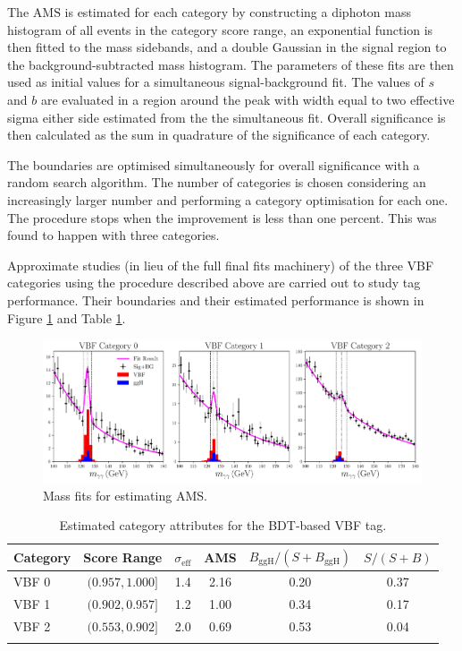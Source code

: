 The $\mathrm{AMS}$ is estimated for each category by constructing a diphoton mass histogram of all events in the category score range, an exponential function is then fitted to the mass sidebands, and a double Gaussian in the signal region to the background-subtracted mass histogram. The parameters of these fits are then used as initial values for a simultaneous signal-background fit. 
The values of $s$ and $b$ are evaluated in a region around the peak with width equal to two effective sigma either side estimated from the the simultaneous fit. Overall significance is then calculated as the sum in quadrature of the significance of each category. 

The boundaries are optimised simultaneously for overall significance with a random search algorithm. The number of categories is chosen considering an increasingly larger number and performing a category optimisation for each one. The procedure stops when the improvement is less than one percent. This was found to happen with three categories. 

Approximate studies (in lieu of the full final fits machinery) of the three VBF categories using the procedure described above are carried out to study tag performance. Their boundaries and their estimated performance is shown in Figure \ref{fig:event_categorisaton:bdt_mass_fits} and Table \ref{tab:event_selection:legacy_cats}.
\begin{figure}[h!]
    \centering
    \includegraphics[width=1.0\textwidth]{figures/event_selection/BDT_mass_fits.pdf}
    \caption{Mass fits for estimating AMS.}
    \label{fig:event_categorisaton:bdt_mass_fits}
\end{figure}
\begin{table}[h!]
    \centering
    \renewcommand{\arraystretch}{1.3}
    \begin{tabular}{ l | c c c c c }
        \thickhline
        Category & Score Range & $\sigma_{\mathrm{eff}}$ & AMS & $B_{\mathrm{ggH}}/(S+B_{\mathrm{ggH}})$ & $S/(S+B)$ \\
        \hline
        VBF 0 & $(0.957, 1.000]$ & 1.4 &  2.16 & 0.20 & 0.37 \\
        VBF 1 & $(0.902, 0.957]$ & 1.2 &  1.00 & 0.34 & 0.17 \\
        VBF 2 & $(0.553, 0.902]$ & 2.0 &  0.69 & 0.53 & 0.04 \\
        \thickhline
    \end{tabular}
    \caption{Estimated category attributes for the BDT-based VBF tag.}
    \label{tab:event_selection:legacy_cats}
\end{table}






